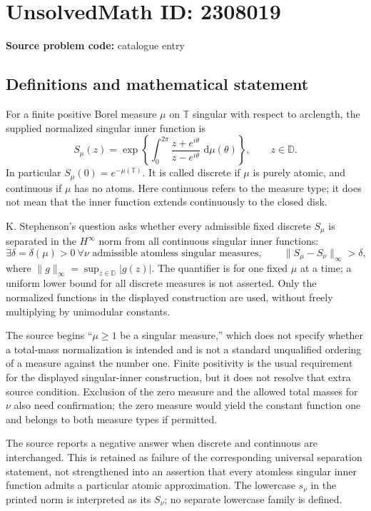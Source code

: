 \documentclass[11pt]{article}
\newcommand{\dd}{\,\mathrm{d}}
\begin{document}
\section*{UnsolvedMath ID: 2308019}
\textbf{Source problem code:} catalogue entry
\subsection{Definitions and mathematical statement}
For a finite positive Borel measure $\mu$ on $\mathbb T$ singular with respect to arclength, the supplied normalized singular inner function is
\[
 S_\mu(z)=\exp\left\{\int_0^{2\pi}
       \frac{z+e^{i\theta}}{z-e^{i\theta}}\,\dd\mu(\theta)\right\},
 \qquad z\in\mathbb D.
\]
In particular $S_\mu(0)=e^{-\mu(\mathbb T)}$. It is called discrete if $\mu$ is purely atomic, and continuous if $\mu$ has no atoms. Here continuous refers to the measure type; it does not mean that the inner function extends continuously to the closed disk.

K. Stephenson's question asks whether every admissible fixed discrete $S_\mu$ is separated in the $H^\infty$ norm from all continuous singular inner functions:
\[
 \exists\delta=\delta(\mu)>0\ \forall\nu\text{ admissible atomless singular measures},
 \qquad\|S_\mu-S_\nu\|_\infty>\delta,
\]
where $\|g\|_\infty=\sup_{z\in\mathbb D}|g(z)|$. The quantifier is for one fixed $\mu$ at a time; a uniform lower bound for all discrete measures is not asserted. Only the normalized functions in the displayed construction are used, without freely multiplying by unimodular constants.

The source begins ``$\mu\geq1$ be a singular measure,'' which does not specify whether a total-mass normalization is intended and is not a standard unqualified ordering of a measure against the number one. Finite positivity is the usual requirement for the displayed singular-inner construction, but it does not resolve that extra source condition. Exclusion of the zero measure and the allowed total masses for $\nu$ also need confirmation; the zero measure would yield the constant function one and belongs to both measure types if permitted.

The source reports a negative answer when discrete and continuous are interchanged. This is retained as failure of the corresponding universal separation statement, not strengthened into an assertion that every atomless singular inner function admits a particular atomic approximation. The lowercase $s_\nu$ in the printed norm is interpreted as its $S_\nu$; no separate lowercase family is defined.
\end{document}
